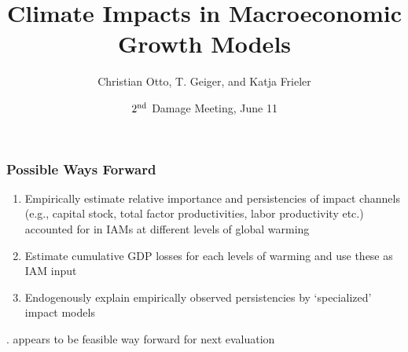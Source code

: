 \documentclass[
c,
11pt,
aspectratio=169, %
final,
]{beamer}
\author{Christian Otto, T. Geiger, and Katja Frieler}
\title{Climate Impacts in Macroeconomic Growth Models}
\date{$2^{\operatorname{nd}}$ Damage Meeting, June 11}
\begin{document}
\begin{frame}[plain]
  \maketitle
\end{frame}
\begin{frame}
  \frametitle{Possible Ways Forward}
  \begin{enumerate}
  \item Empirically estimate relative importance and persistencies of impact channels (e.g., capital stock, total factor productivities, labor productivity etc.) accounted for in IAMs at different levels of global warming
  \item Estimate cumulative GDP losses for each levels of warming and use these as IAM input
  \item Endogenously explain empirically observed persistencies by `specialized' impact models 
  \end{enumerate}
  \begin{itemize}
. appears to be feasible way forward for next evaluation
  \end{itemize}
\end{frame}
\end{document}
